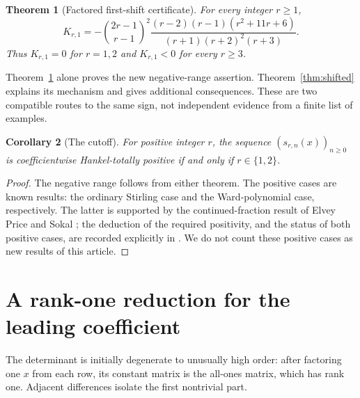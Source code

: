 \documentclass[11pt,a4paper]{article}
\newtheorem{theorem}{Theorem}[section]
\newtheorem{corollary}[theorem]{Corollary}
\theoremstyle{definition}
\numberwithin{equation}{section}
\begin{document}
\begin{theorem}[Factored first-shift certificate]
\label{thm:factored}
For every integer $r\ge1$,
\begin{equation}
 \boxed{\displaystyle
 K_{r,1}=-\binom{2r-1}{r-1}^{\!2}
 \frac{(r-2)(r-1)(r^2+11r+6)}{(r+1)(r+2)^2(r+3)}.}
 \label{eq:factored}
\end{equation}
Thus $K_{r,1}=0$ for $r=1,2$ and $K_{r,1}<0$ for every $r\ge3$.
\end{theorem}

Theorem~\ref{thm:factored} alone proves the new negative-range assertion.
Theorem~\ref{thm:shifted} explains its mechanism and gives additional
consequences. These are two compatible routes to the same sign, not
independent evidence from a finite list of examples.

\begin{corollary}[The cutoff]
\label{cor:cutoff}
For positive integer $r$, the sequence $(s_{r,n}(x))_{n\ge0}$ is
coefficientwise Hankel-totally positive if and only if $r\in\{1,2\}$.
\end{corollary}
\begin{proof}
The negative range follows from either theorem. The positive cases are
known results: the ordinary Stirling case and the Ward-polynomial case,
respectively. The latter is supported by the continued-fraction result of
Elvey Price and Sokal \cite{ElveyPriceSokal}; the deduction of the required
positivity, and the status of both positive cases, are recorded explicitly
in \cite[p.~10]{DebSokal}. We do not count these positive cases as new
results of this article.
\end{proof}

\section{A rank-one reduction for the leading coefficient}
\label{sec:rankone}

The determinant is initially degenerate to unusually high order: after
factoring one $x$ from each row, its constant matrix is the all-ones
matrix, which has rank one. Adjacent differences isolate the first
nontrivial part.
\end{document}
